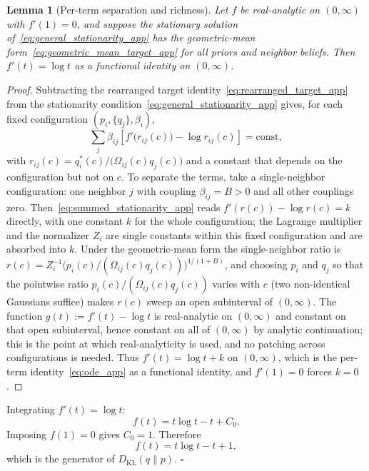 \documentclass[11pt]{article}
\newtheorem{lemma}{Lemma}
\begin{document}
\begin{lemma}[Per-term separation and richness]
\label{lem:richness_app}
Let $f$ be real-analytic on $(0, \infty)$ with $f'(1) = 0$, and suppose the stationary solution of~\eqref{eq:general_stationarity_app} has the geometric-mean form~\eqref{eq:geometric_mean_target_app} for all priors and neighbor beliefs. Then $f'(t) = \log t$ as a functional identity on $(0, \infty)$.
\end{lemma}

\begin{proof}
Subtracting the rearranged target identity~\eqref{eq:rearranged_target_app} from the stationarity condition~\eqref{eq:general_stationarity_app} gives, for each fixed configuration $(p_i, \{q_j\}, \beta_i)$,
\begin{equation}
\sum_j \beta_{ij}\left[f'\big(r_{ij}(c)\big) - \log r_{ij}(c)\right] = \text{const},
\label{eq:summed_stationarity_app}
\end{equation}
with $r_{ij}(c) = q_i^*(c)/\big(\Omega_{ij}(c)q_j(c)\big)$ and a constant that depends on the configuration but not on $c$. To separate the terms, take a single-neighbor configuration: one neighbor $j$ with coupling $\beta_{ij} = B > 0$ and all other couplings zero. Then~\eqref{eq:summed_stationarity_app} reads $f'(r(c)) - \log r(c) = k$ directly, with one constant $k$ for the whole configuration; the Lagrange multiplier and the normalizer $Z_i$ are single constants within this fixed configuration and are absorbed into $k$. Under the geometric-mean form the single-neighbor ratio is $r(c) = Z_i^{-1}\big(p_i(c)/(\Omega_{ij}(c)q_j(c))\big)^{1/(1+B)}$, and choosing $p_i$ and $q_j$ so that the pointwise ratio $p_i(c)/(\Omega_{ij}(c)q_j(c))$ varies with $c$ (two non-identical Gaussians suffice) makes $r(c)$ sweep an open subinterval of $(0, \infty)$. The function $g(t) := f'(t) - \log t$ is real-analytic on $(0, \infty)$ and constant on that open subinterval, hence constant on all of $(0, \infty)$ by analytic continuation; this is the point at which real-analyticity is used, and no patching across configurations is needed. Thus $f'(t) = \log t + k$ on $(0, \infty)$, which is the per-term identity~\eqref{eq:ode_app} as a functional identity, and $f'(1) = 0$ forces $k = 0$.
\end{proof}

Integrating $f'(t) = \log t$:
\[
f(t) = t\log t - t + C_0.
\]
Imposing $f(1)=0$ gives $C_0 = 1$. Therefore
\[
f(t) = t\log t - t + 1,
\]
which is the generator of $D_{\mathrm{KL}}(q\|p)$. \hfill $\square$
\end{document}
